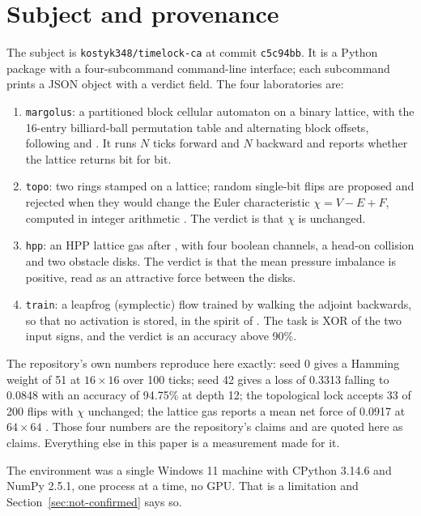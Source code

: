 \documentclass[11pt,a4paper]{article}
\begin{document}
\section{Subject and provenance}
\label{sec:subject}

The subject is \texttt{kostyk348/timelock-ca} at commit \texttt{c5c94bb}. It is a Python package
with a four-subcommand command-line interface; each subcommand prints a JSON object with a
verdict field. The four laboratories are:

\begin{enumerate}
\item \texttt{margolus}: a partitioned block cellular automaton on a binary lattice, with the
  16-entry billiard-ball permutation table and alternating block offsets, following
  \citet{margolus1984} and \citet{margolus1987book}. It runs $N$ ticks forward and $N$ backward
  and reports whether the lattice returns bit for bit.
\item \texttt{topo}: two rings stamped on a lattice; random single-bit flips are proposed and
  rejected when they would change the Euler characteristic $\chi = V - E + F$, computed in
  integer arithmetic \citep{kong1989}. The verdict is that $\chi$ is unchanged.
\item \texttt{hpp}: an HPP lattice gas after \citet{hardy1976}, with four boolean channels, a
  head-on collision and two obstacle disks. The verdict is that the mean pressure imbalance is
  positive, read as an attractive force between the disks.
\item \texttt{train}: a leapfrog (symplectic) flow trained by walking the adjoint backwards, so
  that no activation is stored, in the spirit of \citet{chen2018neuralode}. The task is XOR of
  the two input signs, and the verdict is an accuracy above 90\%.
\end{enumerate}

The repository's own numbers reproduce here exactly: seed 0 gives a Hamming weight of 51 at
$16\times16$ over 100 ticks; seed 42 gives a loss of 0.3313 falling to 0.0848 with an accuracy of
94.75\% at depth 12; the topological lock accepts 33 of 200 flips with $\chi$ unchanged; the
lattice gas reports a mean net force of 0.0917 at $64\times64$ \citep{timelockca}. Those four
numbers are the repository's claims and are quoted here as claims. Everything else in this paper
is a measurement made for it.

The environment was a single Windows 11 machine with CPython 3.14.6 and NumPy 2.5.1, one process
at a time, no GPU. That is a limitation and Section~\ref{sec:not-confirmed} says so.
\end{document}
